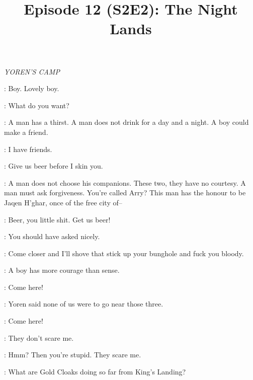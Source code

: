 

\title{Episode 12 (S2E2): The Night Lands}
\author{}
\date{}
\maketitle



\scene

\textit{YOREN'S CAMP}


\JAQEN: Boy. Lovely boy.

\ARYA: What do you want?

\JAQEN: A man has a thirst. A man does not drink for a day and a night. A boy could make a friend.

\ARYA: I have friends.

\RORGE: Give us beer before I skin you.

\JAQEN: A man does not choose his companions. These two, they have no courtesy. A man must ask forgiveness.  You're called Arry? This man has the honour to be Jaqen H'ghar, once of the free city of--

\RORGE: Beer, you little shit. Get us beer!

\ARYA: You should have asked nicely.


\RORGE: Come closer and I'll shove that stick up your bunghole and fuck you bloody.

\JAQEN: A boy has more courage than sense.

\RORGE: Come here!


\GENDRY: Yoren said none of us were to go near those three.

\RORGE: Come here!

\ARYA: They don't scare me.

\GENDRY: Hmm? Then you're stupid. They scare me.


\ARYA: What are Gold Cloaks doing so far from King's Landing?

